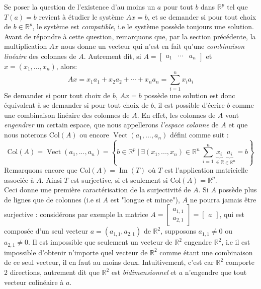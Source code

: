 \documentclass{article}
\newcommand{\R}{\mathbb{R}}
\newcommand{\Col}{\text{Col}}
\DeclareMathOperator{\Ima}{Im}
\DeclareMathOperator{\Vect}{Vect}
\begin{document}
\noindent Se poser la question de l'existence d'au moins un $a$ pour tout $b$ dans $\R^p$ tel que $T(a)=b$ revient à étudier le système $Ax=b$, et se demander si pour tout choix de $b \in \R^p$, le système est \textit{compatible}, i.e le système possède toujours une solution. \\

\noindent Avant de répondre à cette question, remarquons que, par la section précédente, la multiplication $Ax$ nous donne un vecteur qui n'est en fait qu'une \textit{combinaison linéaire} des colonnes de $A$. Autrement dit, si $A = \begin{bmatrix} a_1 & \cdots & a_n\end{bmatrix}$ et $x = (x_1, ..., x_n)$, alors:
$$Ax = x_1 a_1 + x_2 a_2 + \cdots + x_n a_n = \sum_{i=1}^{n}x_i a_i$$
Se demander si pour tout choix de $b$, $Ax=b$ possède une solution est donc équivalent à se demander si pour tout choix de $b$, il est possible d'écrire $b$ comme une combinaison linéaire des colonnes de $A$. En effet, les colonnes de $A$ vont \textit{engendrer} un certain espace, que nous appellerons \textit{l'espace colonne} de $A$ et que nous noterons $\Col(A)$ ou encore $\Vect(a_1, ..., a_n)$ défini comme suit :
$$\Col(A) = \Vect(a_1, ..., a_n) = \left\{b \in \R^p \ | \ \exists (x_1, ..., x_n) \in \R^n \ \sum_{i=1}^n \underbrace{x_i}_{\in \R}\underbrace{a_i}_{\in \R^n} = b\right\}
$$
Remarquons encore que $\Col(A) = \Ima(T)$ où $T$ est l'application matricielle associée à $A$. Ainsi $T$ est surjective, si et seulement si $\Col(A) = \R^p$. \\
Ceci donne une première caractérisation de la surjectivité de $A$. Si $A$ possède plus de lignes que de colonnes (i.e si $A$ est "longue et mince"), $A$ ne pourra jamais être surjective : considérons par exemple la matrice $A = \begin{bmatrix}
a_{1,1} \\
a_{2,1} \end{bmatrix} = \begin{bmatrix}
a
\end{bmatrix}$, qui est composée d'un seul vecteur $a = (a_{1,1}, a_{2,1})$ de $\R^2$, supposons $a_{1,1} \neq 0$ ou $a_{2,1} \neq 0$. Il est impossible que seulement un vecteur de $\R^2$ engendre $\R^2$, i.e il est impossible d'obtenir n'importe quel vecteur de $\R^2$ comme étant une combinaison de ce seul vecteur, il en faut au moins deux. Intuitivement, c'est car $\R^2$ comporte 2 directions, autrement dit que $\R^2$ est \textit{bidimensionnel} et $a$ n'engendre que tout vecteur colinéaire à $a$. \\
\end{document}
